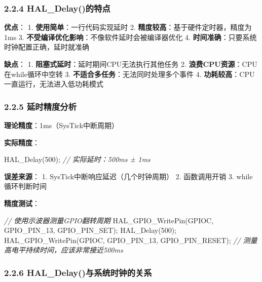 \documentclass[
  chinese,
  UTF8,
  oneside,
  openany]{ctexbook}
\newenvironment{Shaded}{}{}
\newcommand{\CommentTok}[1]{\textcolor[rgb]{0.38,0.63,0.69}{\textit{#1}}}
\newcommand{\DecValTok}[1]{\textcolor[rgb]{0.25,0.63,0.44}{#1}}
\newcommand{\NormalTok}[1]{#1}
\newcommand{\OperatorTok}[1]{\textcolor[rgb]{0.40,0.40,0.40}{#1}}
\begin{document}
\subsubsection{2.2.4
HAL\_Delay()的特点}\label{hal_delayux7684ux7279ux70b9}

\textbf{优点}： 1. \textbf{使用简单}：一行代码实现延时 2.
\textbf{精度较高}：基于硬件定时器，精度为1ms 3.
\textbf{不受编译优化影响}：不像软件延时会被编译器优化 4.
\textbf{时间准确}：只要系统时钟配置正确，延时就准确

\textbf{缺点}： 1. \textbf{阻塞式延时}：延时期间CPU无法执行其他任务 2.
\textbf{浪费CPU资源}：CPU在while循环中空转 3.
\textbf{不适合多任务}：无法同时处理多个事件 4.
\textbf{功耗较高}：CPU一直运行，无法进入低功耗模式

\subsubsection{2.2.5
延时精度分析}\label{ux5ef6ux65f6ux7cbeux5ea6ux5206ux6790}

\textbf{理论精度}：1ms（SysTick中断周期）

\textbf{实际精度}：

\begin{Shaded}
\begin{Highlighting}[]
\NormalTok{HAL\_Delay}\OperatorTok{(}\DecValTok{500}\OperatorTok{);}  \CommentTok{// 实际延时：500ms ± 1ms}
\end{Highlighting}
\end{Shaded}

\textbf{误差来源}： 1. SysTick中断响应延迟（几个时钟周期） 2.
函数调用开销 3. while循环判断时间

\textbf{精度测试}：

\begin{Shaded}
\begin{Highlighting}[]
\CommentTok{// 使用示波器测量GPIO翻转周期}
\NormalTok{HAL\_GPIO\_WritePin}\OperatorTok{(}\NormalTok{GPIOC}\OperatorTok{,}\NormalTok{ GPIO\_PIN\_13}\OperatorTok{,}\NormalTok{ GPIO\_PIN\_SET}\OperatorTok{);}
\NormalTok{HAL\_Delay}\OperatorTok{(}\DecValTok{500}\OperatorTok{);}
\NormalTok{HAL\_GPIO\_WritePin}\OperatorTok{(}\NormalTok{GPIOC}\OperatorTok{,}\NormalTok{ GPIO\_PIN\_13}\OperatorTok{,}\NormalTok{ GPIO\_PIN\_RESET}\OperatorTok{);}
\CommentTok{// 测量高电平持续时间，应该非常接近500ms}
\end{Highlighting}
\end{Shaded}

\subsubsection{2.2.6
HAL\_Delay()与系统时钟的关系}\label{hal_delayux4e0eux7cfbux7edfux65f6ux949fux7684ux5173ux7cfb}
\end{document}
